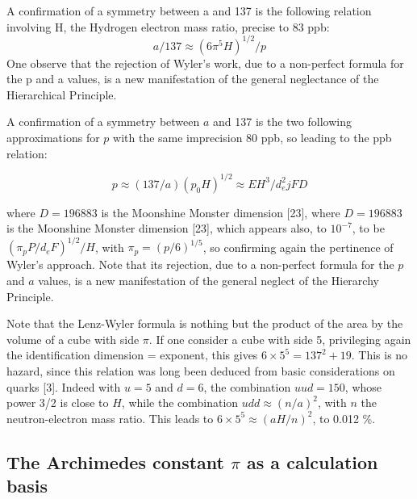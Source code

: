 \documentclass[twoside,draft]{article}
\begin{document}
\begin{sloppypar}
{A confirmation of a symmetry between a and 137 is the following relation involving H, the
Hydrogen electron mass ratio, precise to 83 ppb:
$$a/137 \approx (6\pi^{5} H)^{1/2} /p$$
One observe that the rejection of Wyler's work, due to a non-perfect formula for the p and a values, is a new
manifestation of the general neglectance of the Hierarchical Principle.


A confirmation of a symmetry between $a$ and 137 is the two following approximations for $p$ with the same imprecision 80 ppb, so leading to the ppb relation:

 $$p \approx (137/a) (p_0 H)^{1/2}  \approx EH^3/d_e^2jFD $$ 

where $D = 196883$ is the Moonshine Monster dimension [23], where $D = 196883$ is the Moonshine Monster dimension [23], which appears also, to $10^{-7}$, to be $(\pi_p P/d_eF)^{1/2}/H$, with $\pi_p = (p/6)^{1/5}$, so confirming again the pertinence of Wyler's approach. Note that its rejection, due to a non-perfect formula for the $p$ and $a$ values, is a new manifestation of the general neglect of the Hierarchy Principle.

Note that the Lenz-Wyler formula is nothing but the product of the area by the volume of a cube with side $\pi $. If one consider a cube with side 5, privileging again the identification dimension = exponent, this gives $6 \times 5^5 = 137^2 + 19 $. This is no hazard, since this relation was long been deduced from basic considerations on quarks [3]. Indeed with $u = 5 $ and $d = 6 $, the combination $uud = 150 $, whose power 3/2 is close to $H $, while the combination $udd \approx (n/a)^2 $, with $n $ the neutron-electron mass ratio. This leads to $6\times 5^5 \approx (aH/n)^2 $, to 0.012 \%. 

\subsection {The Archimedes constant $\pi$ as a calculation basis}

}
\end{sloppypar}
\end{document}

